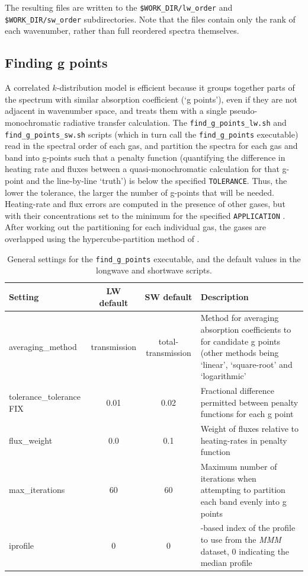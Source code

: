\documentclass[a4,oneside]{article}
\def\codesize{\small}
\def\codesize{\small}
\def\code#1{{\codesize\texttt{#1}}}
\begin{document}
The resulting files are written to the \code{\$WORK\_DIR/lw\_order}
and \code{\$WORK\_DIR/sw\_order} subdirectories.  Note that the files
contain only the rank of each wavenumber, rather than full reordered
spectra themselves.

\subsection{Finding g points}
A correlated $k$-distribution model is efficient because it groups
together parts of the spectrum with similar absorption coefficient (`g
points'), even if they are not adjacent in wavenumber space, and
treats them with a single pseudo-monochromatic radiative transfer
calculation.  The \code{find\_g\_points\_lw.sh} and
\code{find\_g\_points\_sw.sh} scripts (which in turn call the
\code{find\_g\_points} executable) read in the spectral order of each
gas, and partition the spectra for each gas and band into g-points
such that a penalty function (quantifying the difference in heating
rate and fluxes between a quasi-monochromatic calculation for that
g-point and the line-by-line `truth') is below the specified
\code{TOLERANCE}. Thus, the lower the tolerance, the larger the number
of g-points that will be needed. Heating-rate and flux errors are
computed in the presence of other gases, but with their concentrations
set to the minimum for the specified \code{APPLICATION} \citep[for all
applications the minimum water vapour and ozone are taken from the
\emph{MMM} dataset, while for the climate application the greenhouse
gas concentrations are set to the minima of the scenarios listed in
Table 2 of][]{Hogan&2020}.  After working out the partitioning for
each individual gas, the gases are overlapped using the
hypercube-partition method of \cite{Hogan2010}.

\begin{table}[tb!]
\caption{\label{tab:find_g_points}General settings for the
  \code{find\_g\_points} executable, and the default values in the
  longwave and shortwave scripts.}
\begin{center}
\begin{tabular}{lcc>{\raggedright\arraybackslash}p{7cm}}
\hline
Setting & LW default & SW default & Description\\
\hline
averaging\_method & transmission & total-transmission & Method for averaging absorption coefficients to for candidate g points (other methods being `linear', `square-root' and `logarithmic' \\
tolerance\_tolerance FIX & 0.01 & 0.02 & Fractional difference permitted between penalty functions for each g point \\
flux\_weight & 0.0 & 0.1 & Weight of fluxes relative to heating-rates in penalty function \\
max\_iterations & 60 & 60 & Maximum number of iterations when attempting to partition each band evenly into g points\\
iprofile & 0 & 0 & 0-based index of the profile to use from the \emph{MMM} dataset, 0 indicating the median profile\\
\hline
\end{tabular}
\end{center}
\end{table}
\end{document}
